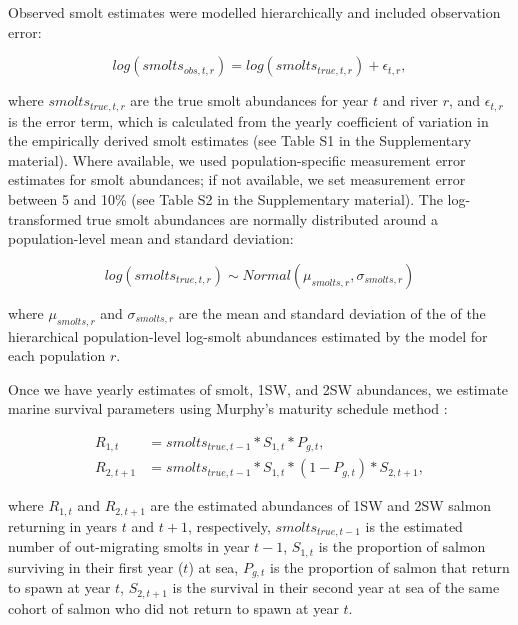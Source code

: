 \documentclass[12pt]{article}
\newcommand{\comment}[1]{\par {\bfseries \color{blue} #1 \par}} %
\begin{document}

Observed smolt estimates were modelled hierarchically and included
observation error:

\begin{equation}
log(smolts_{obs,t,r}) = log(smolts_{true,t,r}) + \epsilon_{t,r},
\end{equation}

where $smolts_{true,t,r}$ are the true smolt abundances for year $t$ and river
$r$, and $\epsilon_{t,r}$ is the error term, which is calculated from the yearly 
coefficient of variation in the empirically derived
smolt estimates (see Table S1 in the Supplementary material). 
Where available, we used population-specific measurement error estimates for smolt abundances; if not 
available, we set measurement error between 5 and 10\% (see Table S2 in the Supplementary material). 
The log-transformed true smolt abundances are
normally distributed around a population-level mean and standard deviation:

\begin{equation}
log(smolts_{true,t,r}) \sim Normal(\mu_{smolts,r}, \sigma_{smolts,r})
\end{equation}

where $\mu_{smolts,r}$ and $\sigma_{smolts,r}$ are the mean and standard
deviation of the of the hierarchical population-level log-smolt abundances
estimated by the model for each population $r$.

Once we have yearly estimates of smolt, 1SW, and 2SW abundances, we estimate
marine survival parameters using Murphy's maturity schedule method
\citep{Murphy1952, Ricker1975}:

\begin{align}
    R_{1,t} &= smolts_{true,t-1} * S_{1,t} * P_{g,t} \label{eq:1}, \\
    R_{2,t+1} &= smolts_{true,t-1} * S_{1,t} * (1 - P_{g,t}) * S_{2,t+1}, \label{eq:2}
\end{align}

where $R_{1,t}$ and $R_{2,t+1}$ are the estimated abundances of 1SW and 2SW
salmon returning in years $t$ and $t+1$, respectively, $smolts_{true,t-1}$ is the
estimated number of out-migrating smolts in year $t-1$, $S_{1,t}$ is the proportion of
salmon surviving in their first year ($t$) at sea, $P_{g,t}$ is the proportion of
salmon that return to spawn at year $t$, $S_{2,t+1}$ is the survival in their
second year at sea of the same cohort of salmon who did not return to spawn at
year $t$.
\end{document}
